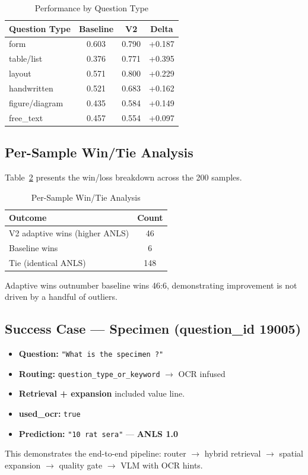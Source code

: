 \documentclass[11pt,a4paper]{article}
\begin{document}
\begin{table}[H]
\centering
\caption{Performance by Question Type}
\label{tab:qtype_perf}
\begin{tabular}{|l|c|c|c|}
\hline
\textbf{Question Type} & \textbf{Baseline} & \textbf{V2} & \textbf{Delta} \\ \hline
form & 0.603 & 0.790 & +0.187 \\ \hline
table/list & 0.376 & 0.771 & +0.395 \\ \hline
layout & 0.571 & 0.800 & +0.229 \\ \hline
handwritten & 0.521 & 0.683 & +0.162 \\ \hline
figure/diagram & 0.435 & 0.584 & +0.149 \\ \hline
free\_text & 0.457 & 0.554 & +0.097 \\ \hline
\end{tabular}
\end{table}

\subsection{Per-Sample Win/Tie Analysis}
Table~\ref{tab:wintie_analysis} presents the win/loss breakdown across the 200 samples.

\begin{table}[H]
\centering
\caption{Per-Sample Win/Tie Analysis}
\label{tab:wintie_analysis}
\begin{tabular}{|l|c|}
\hline
\textbf{Outcome} & \textbf{Count} \\ \hline
V2 adaptive wins (higher ANLS) & 46 \\ \hline
Baseline wins & 6 \\ \hline
Tie (identical ANLS) & 148 \\ \hline
\end{tabular}
\end{table}
Adaptive wins outnumber baseline wins 46:6, demonstrating improvement is not driven by a handful of outliers.

\subsection{Success Case --- Specimen (question\_id 19005)}
\begin{itemize}
    \item \textbf{Question:} \texttt{"What is the specimen ?"}
    \item \textbf{Routing:} \texttt{question\_type\_or\_keyword} $\rightarrow$ OCR infused
    \item \textbf{Retrieval + expansion} included value line.
    \item \textbf{used\_ocr:} \texttt{true}
    \item \textbf{Prediction:} \texttt{"10 rat sera"} --- \textbf{ANLS 1.0}
\end{itemize}
This demonstrates the end-to-end pipeline: router $\rightarrow$ hybrid retrieval $\rightarrow$ spatial expansion $\rightarrow$ quality gate $\rightarrow$ VLM with OCR hints.
\end{document}
